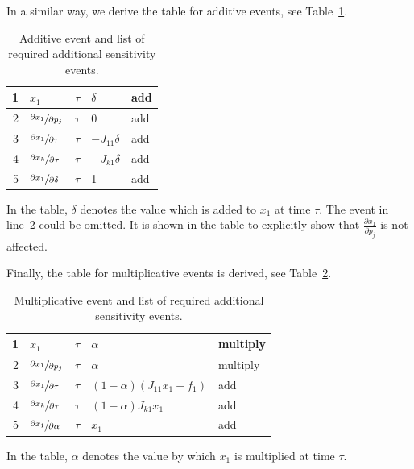 \documentclass[journal, a4paper]{IEEEtran}
\begin{document}
In a similar way, we derive the table for additive events, see Table~\ref{tab:additive}.
\begin{table}[ht]
\caption{Additive event and list of required additional sensitivity events.}
\label{tab:additive}
\begin{center}
\begin{tabular}{|r|l|l|l|l|}\hline
     1 & $x_1$ & $\tau$ & $\delta$ & add \\
     \hline
     2 & $\sfrac{\partial x_1}{\partial p_j}$ & $\tau$ & $0$ & add \\
     3 & $\sfrac{\partial x_1}{\partial \tau}$ & $\tau$ & $-J_{11}\delta$ & add \\
     4 & $\sfrac{\partial x_k}{\partial \tau}$ & $\tau$ & $-J_{k1}\delta$ & add \\
     5 &$\sfrac{\partial x_1}{\partial \delta}$ & $\tau$ & 1 & add \\
     \hline
\end{tabular}
\end{center}
\end{table}
In the table, $\delta$ denotes the value which is added to $x_1$ at time $\tau$. The event in line~2 could be omitted. It is shown in the table to explicitly show that $\frac{\partial x_1}{\partial p_j}$ is not affected. 

Finally, the table for multiplicative events is derived, see Table~\ref{tab:multi}.
\begin{table}[ht]
\caption{Multiplicative event and list of required additional sensitivity events.}
\label{tab:multi}
\begin{center}
\begin{tabular}{|r|l|l|l|l|}\hline
     1 & $x_1$ & $\tau$ & $\alpha$ & multiply \\
     \hline
     2 & $\sfrac{\partial x_1}{\partial p_j}$ & $\tau$ & $\alpha$ & multiply \\
     3 & $\sfrac{\partial x_1}{\partial \tau}$ & $\tau$ & $(1-\alpha)(J_{11}x_1-f_1)$ & add \\
     4 & $\sfrac{\partial x_k}{\partial \tau}$ & $\tau$ & $(1-\alpha)J_{k1}x_1$ & add \\
     5 &$\sfrac{\partial x_1}{\partial \alpha}$ & $\tau$ & $x_1$ & add \\
     \hline
\end{tabular}
\end{center}
\end{table}
In the table, $\alpha$ denotes the value by which $x_1$ is multiplied at time $\tau$. 
\end{document}
